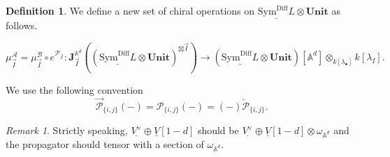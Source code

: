 \documentclass[11pt]{amsart}
\theoremstyle{definition}
\newtheorem{defn}[thm]{Definition}
\theoremstyle{remark}
\newtheorem{rem}[thm]{Remark}
\numberwithin{equation}{section}
\begin{document}
\begin{defn}
We define a new set of chiral operations on $\underline{\mathrm{Sym}^{\mathrm{Diff}}L}\otimes \mathbf{Unit}$ as follows.

$$
\mu^{\mathcal{A}}_{\overrightarrow{I}}=\mu^{\mathcal{B}}_{\overrightarrow{I}}\circ e^{\mathcal{P}_{\overrightarrow{I}}}:\mathbf{J}^{\mathbb{A}^d}_{\overrightarrow{I}}\left((\underline{\mathrm{Sym}^{\mathrm{Diff}}L}\otimes \mathbf{Unit})^{\boxtimes\overrightarrow{I}} \right)\rightarrow (\underline{\mathrm{Sym}^{\mathrm{Diff}}L}\otimes \mathbf{Unit})[\mathbb{A}^d]\otimes_{k[\lambda_{\bullet}]}k[\lambda_{I}].
$$

\end{defn}

We use the following convention
$$
\overrightarrow{\mathcal{P}}_{\{i,j\}}(-)=\mathcal{P}_{\{i,j\}}(-)=(-)\overleftarrow{\mathcal{P}}_{\{i,j\}}.
$$


\begin{rem}
    Strictly speaking, $\underline{V^{\vee}}\oplus\underline{V}[1-d]$ should be $\underline{V^{\vee}}\oplus\underline{V}[1-d]\otimes \omega_{\mathbb{A}^d}$ and the propagator should tensor with a section of $\omega_{\mathbb{A}^d}$.
\end{rem}
\end{document}
